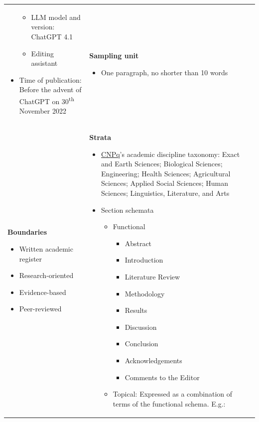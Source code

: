\begin{longtable}[c]{ |p{8cm}|p{8cm}|p{8cm}| }
\begin{itemize}
\begin{itemize}
            \item LLM model and version: ChatGPT 4.1
            \item Editing assistant
        \end{itemize}
        \item Time of publication: Before the advent of ChatGPT on 30\textsuperscript{th} November 2022
    \end{itemize}
     &
    \textbf{Sampling unit}
    \begin{itemize}
        \item One paragraph, no shorter than 10 words
    \end{itemize}
     \\
    \textbf{Boundaries}
    \begin{itemize}
        \item Written academic register
        \item Research-oriented
        \item Evidence-based
        \item Peer-reviewed
    \end{itemize}
     &
    \textbf{Strata}
    \begin{itemize}
        \item \href{https://www.gov.br/cnpq/pt-br}{CNPq}'s academic discipline taxonomy: Exact and Earth Sciences; Biological Sciences; Engineering; Health Sciences; Agricultural Sciences; Applied Social Sciences; Human Sciences; Linguistics, Literature, and Arts
        \item Section schemata
        \begin{itemize}
            \item Functional
            \begin{itemize}
                \item Abstract
                \item Introduction
                \item Literature Review
                \item Methodology
                \item Results
                \item Discussion
                \item Conclusion
                \item Acknowledgements
                \item Comments to the Editor
            \end{itemize}
            \item Topical: Expressed as a combination of terms of the functional schema. E.g.:

\end{itemize}
\end{itemize}
\end{longtable}

